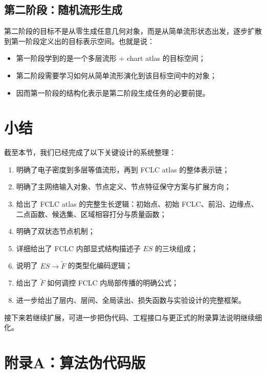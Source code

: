\documentclass[12pt,a4paper]{ctexart}
\begin{document}
\subsection{第二阶段：随机流形生成}
第二阶段的目标不是从零生成任意几何对象，而是从简单流形状态出发，逐步扩散到第一阶段定义出的目标表示空间。也就是说：

\begin{itemize}[leftmargin=2em]
    \item 第一阶段学到的是一个多层流形 + chart atlas 的目标空间；
    \item 第二阶段需要学习如何从简单流形演化到该目标空间中的对象；
    \item 因而第一阶段的结构化表示是第二阶段生成任务的必要前提。
\end{itemize}

\section{小结}

截至本节，我们已经完成了以下关键设计的系统整理：

\begin{enumerate}[leftmargin=2em]
    \item 明确了电子密度到多层等值流形，再到 FCLC atlas 的整体表示链；
    \item 明确了主网络输入对象、节点定义、节点特征保守方案与扩展方向；
    \item 给出了 FCLC atlas 的完整生长逻辑：初始点、初始 FCLC、前沿、边缘点、二点函数、候选集、区域相容打分与质量函数；
    \item 明确了双状态节点机制；
    \item 详细给出了 FCLC 内部显式结构描述子 \(ES\) 的三块组成；
    \item 说明了 \(ES\to \tilde F\) 的类型化编码逻辑；
    \item 给出了 \(\tilde F\) 如何调控 FCLC 内局部传播的明确公式；
    \item 进一步给出了层内、层间、全局读出、损失函数与实验设计的完整框架。
\end{enumerate}

接下来若继续扩展，可进一步把伪代码、工程接口与更正式的附录算法说明继续细化。

\appendix

\section{附录A：算法伪代码版}
\end{document}
